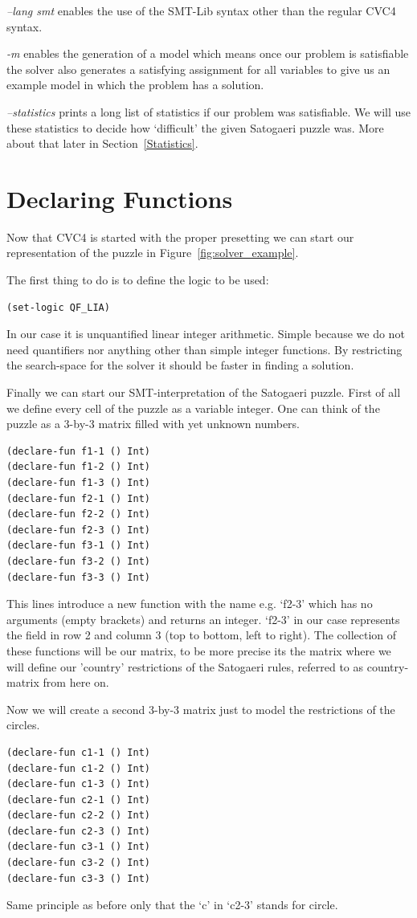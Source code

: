 \emph{--lang smt} enables the use of the SMT-Lib syntax other than the regular CVC4 syntax.

\emph{-m} enables the generation of a model which means once our problem is satisfiable the solver also generates a satisfying assignment for all variables to give us an example model in which the problem has a solution.

\emph{--statistics} prints a long list of statistics if our problem was satisfiable. We will use these statistics to decide how `difficult' the given Satogaeri puzzle was. More about that later in Section~\ref{Statistics}. 

\section{Declaring Functions}
Now that CVC4 is started with the proper presetting we can start our representation of the puzzle in Figure~\ref{fig:solver_example}.

The first thing to do is to define the logic to be used:
\begin{lstlisting}
(set-logic QF_LIA)
\end{lstlisting}
In our case it is unquantified linear integer arithmetic. Simple because we do not need quantifiers nor anything other than simple integer functions. By restricting the search-space for the solver it should be faster in finding a solution.

Finally we can start our SMT-interpretation of the Satogaeri puzzle. First of all we define every cell of the puzzle as a variable integer. One can think of the puzzle as a 3-by-3 matrix filled with yet unknown numbers.
\begin{lstlisting}
(declare-fun f1-1 () Int)
(declare-fun f1-2 () Int)
(declare-fun f1-3 () Int)
(declare-fun f2-1 () Int)
(declare-fun f2-2 () Int)
(declare-fun f2-3 () Int)
(declare-fun f3-1 () Int)
(declare-fun f3-2 () Int)
(declare-fun f3-3 () Int)
\end{lstlisting}
This lines introduce a new function with the name e.g. `f2-3' which has no arguments (empty brackets) and returns an integer. `f2-3' in our case represents the field in row 2 and column 3 (top to bottom, left to right). The collection of these functions will be our matrix, to be more precise its the matrix where we will define our 'country' restrictions of the Satogaeri rules, referred to as country-matrix from here on.

Now we will create a second 3-by-3 matrix just to model the restrictions of the circles.
\begin{lstlisting}
(declare-fun c1-1 () Int)
(declare-fun c1-2 () Int)
(declare-fun c1-3 () Int)
(declare-fun c2-1 () Int)
(declare-fun c2-2 () Int)
(declare-fun c2-3 () Int)
(declare-fun c3-1 () Int)
(declare-fun c3-2 () Int)
(declare-fun c3-3 () Int)
\end{lstlisting}
Same principle as before only that the `c' in `c2-3' stands for circle.

